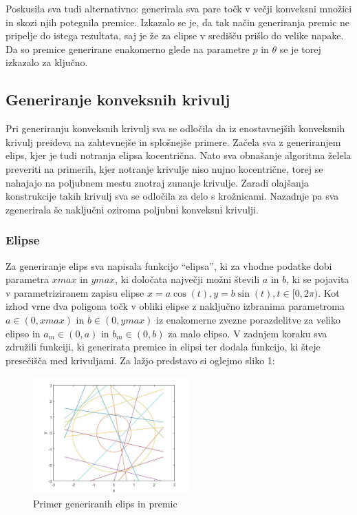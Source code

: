 \documentclass[a4paper]{article}
\begin{document}
Poskusila sva tudi alternativno: generirala sva pare točk v večji konveksni množici in skozi njih potegnila premice. Izkazalo se je, da tak način generiranja premic ne pripelje do istega rezultata, saj je že za elipse v središču prišlo do velike napake. Da so premice generirane enakomerno glede na parametre $p$ in $\theta$ se je torej izkazalo za ključno.

\subsection{Generiranje konveksnih krivulj}
Pri generiranju konveksnih krivulj sva se odločila da iz enostavnejših konveksnih krivulj preideva na zahtevnejše in splošnejše primere. Začela sva z generiranjem elips, kjer je tudi notranja elipsa kocentrična. Nato sva obnašanje algoritma želela preveriti na primerih, kjer notranje krivulje niso nujno kocentrične, torej se nahajajo na poljubnem mestu znotraj zunanje krivulje. Zaradi olajšanja konstrukcije takih krivulj sva se odločila za delo s krožnicami. Nazadnje pa sva zgenerirala še naključni oziroma poljubni konveksni krivulji. 

\subsubsection{Elipse}
Za generiranje elips sva napisala funkcijo ``elipsa'', ki za vhodne podatke dobi parametra $xmax$ in $ymax$, ki določata največji možni števili $a$ in $b$, ki se pojavita v parametriziranem zapisu elipse $x=a \cos(t), y=b \sin(t), t\in [0, 2\pi)$. Kot izhod vrne dva poligona točk v obliki elipse z naključno izbranima parametroma $a \in (0, xmax)$ in $b \in (0, ymax)$ iz enakomerne zvezne porazdelitve za veliko elipso in $a_m \in (0, a)$ in $b_m \in (0, b)$ za malo elipso. V zadnjem koraku sva združili funkciji, ki generirata premice in elipsi ter dodala funkcijo, ki šteje presečišča med krivuljami. Za lažjo predstavo si oglejmo sliko 1:

\begin{figure}[h]
\centering
\includegraphics[width=60mm]{graf_primer.jpg}
\caption{Primer generiranih elips in premic \label{overflow}}
\end{figure} 
\end{document}
